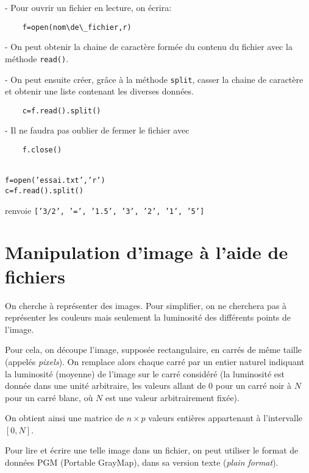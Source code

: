 - Pour ouvrir un fichier en lecture, on écrira:

\begin{lstlisting}
	f=open(nom\de\_fichier,r)
\end{lstlisting}

- On peut obtenir la chaine de caractère formée du contenu du fichier avec la méthode \texttt{read()}.

- On peut ensuite créer, grâce à la méthode \texttt{split}, casser la chaine de caractère et obtenir une liste contenant les diverses données.

\begin{lstlisting}
	c=f.read().split()
\end{lstlisting}

- Il ne faudra pas oublier de fermer le fichier avec 

\begin{lstlisting}
	f.close()
\end{lstlisting}

\begin{exemple}
	\ \\[1mm]
	\texttt{f=open('essai.txt','r')}	\\
	\texttt{c=f.read().split()}
\end{exemple}

renvoie \texttt{['3/2', '=', '1.5', '3', '2', '1', '5']}


\section*{Manipulation d'image à l'aide de fichiers}
	
	On cherche à représenter des  images. Pour simplifier, on ne cherchera
pas  à  représenter les  couleurs  mais  seulement  la luminosité  des
différents points de l'image.  

\medskip Pour cela, on découpe l'image, supposée
rectangulaire,  en carrés  de même  taille (appelés \emph{pixels}). On
remplace  alors chaque
carré  par un  entier  naturel indiquant  la  luminosité (moyenne)  de
l'image sur le carré considéré (la luminosité est donnée dans une
unité arbitraire, les valeurs allant de $0$ pour un carré noir à $N$
pour un carré blanc, où $N$ est une valeur arbitrairement fixée). 

On
obtient ainsi une matrice de $n\times p$ valeurs entières appartenant
à l'intervalle $[0, N]$.

\bigskip Pour lire et écrire une telle image dans un fichier, on peut utiliser
le format de données PGM (Portable GrayMap), dans sa version texte
(\textit{plain format}).

